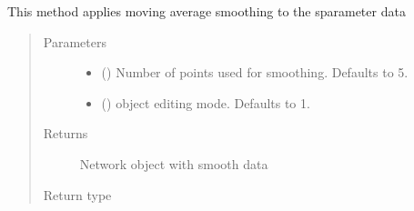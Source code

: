 \documentclass[letterpaper,10pt,english]{sphinxmanual}
\begin{document}
\begin{fulllineitems}
\begin{fulllineitems}
\begin{quote}
\begin{description}
\end{description}\end{quote}

\end{fulllineitems}


\begin{fulllineitems}
\label{\detokenize{touchstone:touchstone.spfile.smoothing}}
This method applies moving average smoothing to the s\sphinxhyphen{}parameter data
\begin{quote}\begin{description}
\item[{Parameters}] \leavevmode\begin{itemize}
\item {} 
 (\sphinxstyleliteralemphasis{\sphinxupquote{, }}) \textendash{} Number of points used for smoothing. Defaults to 5.

\item {} 
 (\sphinxstyleliteralemphasis{\sphinxupquote{, }}) \textendash{} object editing mode. Defaults to \sphinxhyphen{}1.

\end{itemize}

\item[{Returns}] \leavevmode
Network object with smooth data

\item[{Return type}] \leavevmode
{\hyperref[\detokenize{touchstone:touchstone.spfile}]{}}

\end{description}\end{quote}

\end{fulllineitems}



\end{fulllineitems}
\end{document}
